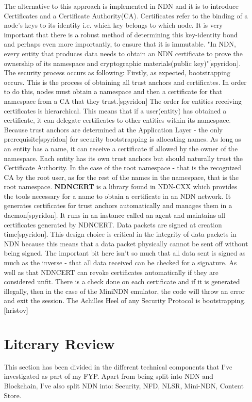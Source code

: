  The alternative to this approach is implemented in NDN and it is to introduce Certificates and a Certificate Authority(CA). Certificates refer to the binding of a node's keys to its identity i.e. which key belongs to which node. It is very important that there is a robust method of determining this key-identity bond and perhaps even more importantly, to ensure that it is immutable. "In NDN, every entity that produces data needs to obtain an NDN certificate to prove the ownership of its namespace and cryptographic materials(public key)"[spyridon].
 The security process occurs as following: Firstly, as expected, bootstrapping occurs. This is the process of obtaining all trust anchors and certificates. In order to do this, nodes must obtain a namespace and then a certificate for that namespace from a CA that they trust.[spyridon] The order for entities receiving certificates is hierarchical. This means that if a user(entity) has obtained a certificate, it can delegate certificates to other entities within its namespace.
 Because trust anchors are determined at the Application Layer - the only prerequisite[spyridon] for security bootstrapping is allocating names. As long as an entity has a name, it can receive a certificate if allowed by the owner of the namespace. 
 Each entity has its own trust anchors but should naturally trust the Certificate Authority. In the case of the root namespace - that is the recognized CA by the root user, as for the rest of the names in the namespace, that is the root namespace.
 \textbf{NDNCERT} is a library found in NDN-CXX which provides the tools necessary for a name to obtain a certificate in an NDN network. It generates certificates for trust anchors automatically and manages them in a daemon[spyridon]. It runs in an instance called an agent and maintains all certificates generated by NDNCERT.
 Data packets are signed at creation time[spyridon]. This design choice is critical in the integrity of data packets in NDN because this means that a data packet physically cannot be sent off without being signed. The important bit here isn't so much that all data sent is signed as much as the inverse - that all data received can be checked for a signature. As well as that NDNCERT can revoke certificates automatically if they are considered unfit. There is a check done on each certificate and if it is generated illegally, then in the case of the MiniNDN emulator, the code will throw an error and exit the session.
 The Achilles Heel of any Security Protocol is bootstrapping.[hristov]


\section{Literary Review}
This section has been divided in the different technical components that I've investigated as part of my FYP. Apart from being split into NDN and Blockchain, I've also split NDN into: Security, NFD, NLSR, Mini-NDN, Content Store.

